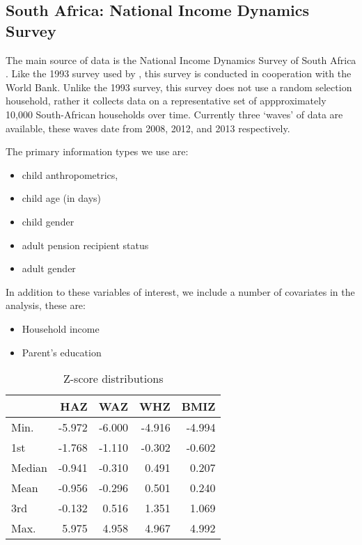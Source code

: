 \begin{refsection}
\subsection{South Africa: National Income Dynamics Survey}
The main source of data is the National Income Dynamics Survey of South Africa \parencite{saldru2008nids, saldru2012nids, saldru2013nids}.
Like the 1993 survey used by \textcite{duflo2000child, duflo2003grandmothers}, this survey is conducted in cooperation with the World Bank.
Unlike the 1993 survey, this survey does not use a random selection household,
rather it collects data on a representative set of appproximately 10,000 South-African households over time.
Currently three `waves' of data are available, these waves date from 2008, 2012, and 2013 respectively.

The primary information types we use are:
\begin{itemize}
  \item child anthropometrics,
  \item child age (in days)
  \item child gender
  \item adult pension recipient status
  \item adult gender
\end{itemize}
In addition to these variables of interest, we include a number of covariates in the analysis, these are:
\begin{itemize}
  \item Household income
  \item Parent's education
\end{itemize}

\begin{table}[hb!]
\centering
\caption{Z-score distributions}
\label{sa:ta:zscore}
    \begin{tabular}{l|rrrr}
    \hline
    & HAZ & WAZ & WHZ & BMIZ\\
    \hline
    Min.   & -5.972 & -6.000  & -4.916 & -4.994 \\
    1st    & -1.768 & -1.110  & -0.302 & -0.602 \\
    Median & -0.941 & -0.310  &  0.491  & 0.207  \\
    Mean   & -0.956 & -0.296  &  0.501  & 0.240   \\
    3rd    & -0.132 &  0.516  &  1.351  & 1.069  \\
    Max.   &  5.975 &  4.958  &  4.967  & 4.992  \\
    \end{tabular}
\end{table}


\end{refsection}
